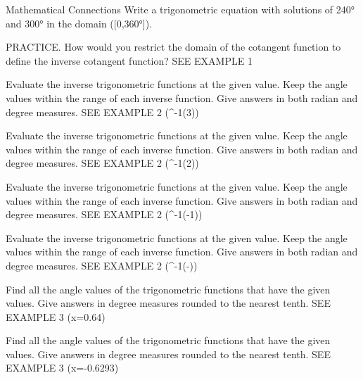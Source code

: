 \documentclass{article}
\newenvironment{practice}[2]{}{}        %
\newcommand{\answer}[1]{}               %
\newcommand{\te}[1]{}                   %
\begin{document}
\begin{practice}{18}{2}
Mathematical Connections Write a trigonometric equation with solutions of 240° and 300° in the domain ([0,360°]).
\answer{Answers may vary. Sample: (2\sin\theta+\sqrt3=0)}
\end{practice}
\begin{practice}{19}{1}
PRACTICE. How would you restrict the domain of the cotangent function to define the inverse cotangent function? SEE EXAMPLE 1
\answer{(0<x<\pi)}
\end{practice}
\begin{practice}{20}{1}
Evaluate the inverse trigonometric functions at the given value. Keep the angle values within the range of each inverse function. Give answers in both radian and degree measures. SEE EXAMPLE 2
(\tan^{-1}(3))
\answer{30° or (\frac\pi6)}
\end{practice}
\begin{practice}{21}{1}
Evaluate the inverse trigonometric functions at the given value. Keep the angle values within the range of each inverse function. Give answers in both radian and degree measures. SEE EXAMPLE 2
(\sin^{-1}(2))
\answer{60° or (\frac\pi3)}
\end{practice}
\begin{practice}{22}{1}
Evaluate the inverse trigonometric functions at the given value. Keep the angle values within the range of each inverse function. Give answers in both radian and degree measures. SEE EXAMPLE 2
(\tan^{-1}(-1))
\answer{-45° or (-\frac\pi4)}
\end{practice}
\begin{practice}{23}{1}
Evaluate the inverse trigonometric functions at the given value. Keep the angle values within the range of each inverse function. Give answers in both radian and degree measures. SEE EXAMPLE 2
(\cos^{-1}(-))
\answer{120 or (\frac{2\pi}3)}
\te{Printed 120 omits the degree symbol; likely120°.}
\end{practice}
\begin{practice}{24}{1}
Find all the angle values of the trigonometric functions that have the given values. Give answers in degree measures rounded to the nearest tenth. SEE EXAMPLE 3
(\sin x=0.64)
\answer{(39.8°+(360°)k), (140.2°+(360°)k), where k is an integer}
\end{practice}
\begin{practice}{25}{1}
Find all the angle values of the trigonometric functions that have the given values. Give answers in degree measures rounded to the nearest tenth. SEE EXAMPLE 3
(\cos x=-0.6293)
\answer{(129.0°+(360°)k), (231.0°+(360°)k), where k is an integer}
\end{practice}
\end{document}
